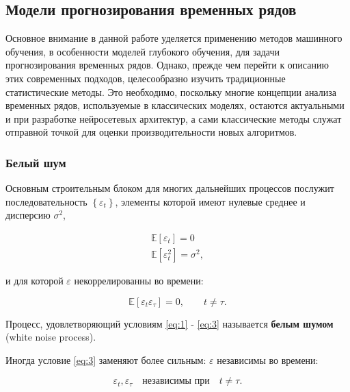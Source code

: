 \subsection{Модели прогнозирования временных рядов}

Основное внимание в данной работе уделяется применению методов 
машинного обучения, в особенности моделей глубокого обучения, 
для задачи прогнозирования временных рядов. Однако, прежде чем перейти к 
описанию этих современных подходов, целесообразно изучить традиционные 
статистические методы. Это необходимо, поскольку многие концепции 
анализа временных рядов, используемые в классических моделях, 
остаются актуальными и при разработке нейросетевых архитектур, а 
сами классические методы служат отправной точкой для оценки 
производительности новых алгоритмов.




\subsubsection{Белый шум}

Основным строительным блоком для многих дальнейших процессов 
послужит последовательность $\left\{ \varepsilon_t \right\}$, 
элементы которой имеют нулевые среднее и дисперсию $\sigma^2$,

\begin{gather}
    \mathbb{E}\left[ \varepsilon_t \right] = 0 \label{eq:1} \\
    \mathbb{E} \left[ \varepsilon_t^2 \right] = \sigma^2, \label{eq:2}
\end{gather}

и для которой $\varepsilon$ некоррелированны во времени:

\begin{equation}
    \mathbb{E} \left[ \varepsilon_t \varepsilon_\tau \right] = 0, \qquad t \neq \tau. \label{eq:3}
\end{equation}

Процесс, удовлетворяющий условиям \eqref{eq:1} - \eqref{eq:3} называется \textbf{белым шумом}
(white noise process).

Иногда условие \eqref{eq:3} заменяют более сильным: $\varepsilon$ 
независимы во времени:

\begin{equation}
    \varepsilon_t, \varepsilon_\tau \quad \text{независимы при} \quad t \neq \tau. \label{eq:4}
\end{equation}

